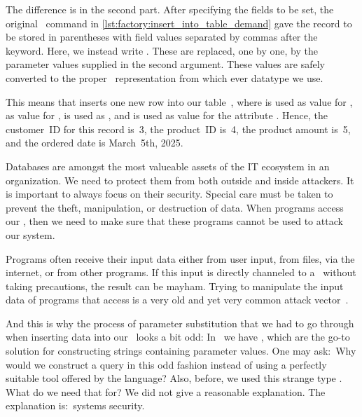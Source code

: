 The difference is in the second part.
After specifying the fields to be set, the original \sql\ command in \cref{lst:factory:insert_into_table_demand} gave the record to be stored in parentheses with field values separated by commas after the  keyword.
Here, we instead write .
These  are replaced, one by one, by the parameter values supplied in the second argument.
These values are safely converted to the proper \sql\ representation from which ever datatype we use.%
%
\begin{sloppypar}%
This means that  inserts one new row into our table~, where  is used as value for ,  as value for ,  is used as , and  is used as value for the attribute .
Hence, the customer~ID for this record is~3, the product~ID is~4, the product amount is~5, and the ordered date is March~5th, 2025.%
\end{sloppypar}%
\FloatBarrier%
\endhsection%
%
%
Databases are amongst the most valueable assets of the IT ecosystem in an organization.
We need to protect them from both outside and inside attackers.
It is important to always focus on their security.
Special care must be taken to prevent the theft, manipulation, or destruction of data.
When programs access our , then we need to make sure that these programs cannot be used to attack our system.

Programs often receive their input data either from user input, from files, via the internet, or from other programs.
If this input is directly channeled to a \db\ without taking precautions, the result can be mayham.
Trying to manipulate the input data of programs that access  is a very old and yet very common attack vector~\cite{S2008SI}.

And this is why the process of parameter substitution that we had to go through when inserting data into our \db\ looks a bit odd:
In \python\ we have , which are the go-to solution for constructing strings containing parameter values.
One may ask:~Why would we construct a query in this odd fashion instead of using a perfectly suitable tool offered by the language?
Also, before, we used this strange type .
What do we need that for?
We did not give a reasonable explanation.
The explanation is:~systems security.

